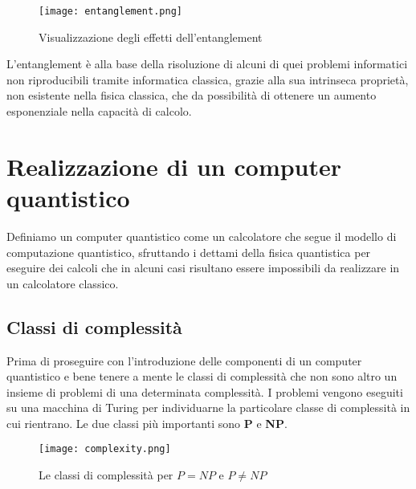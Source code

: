 \begin{figure}[h]
  \centering
  \texttt{[image: entanglement.png]}
  \caption{Visualizzazione degli effetti dell'entanglement}
  \label{fig:entanglement}
\end{figure}

L'entanglement è alla base della risoluzione di alcuni di quei problemi informatici non riproducibili tramite informatica classica, grazie alla sua intrinseca proprietà, non esistente nella fisica classica, che da possibilità di ottenere un aumento esponenziale nella capacità di calcolo.

\section{Realizzazione di un computer quantistico}
Definiamo un computer quantistico come un calcolatore che segue il modello di computazione quantistico, sfruttando i dettami della fisica quantistica per eseguire dei calcoli che in alcuni casi risultano essere impossibili da realizzare in un calcolatore classico.

\subsection{Classi di complessità}
Prima di proseguire con l'introduzione delle componenti di un computer quantistico e bene tenere a mente le classi di complessità che non sono altro un insieme di problemi di una determinata complessità.
I problemi vengono eseguiti su una macchina di Turing per individuarne la particolare classe di complessità in cui rientrano. Le due classi più importanti sono \textbf{P} e \textbf{NP}.

\begin{figure}[h]
  \centering
  \texttt{[image: complexity.png]}
  \caption{Le classi di complessità per \(P = NP\) e \(P \neq NP\)}
  \label{fig:complexity}
\end{figure}


